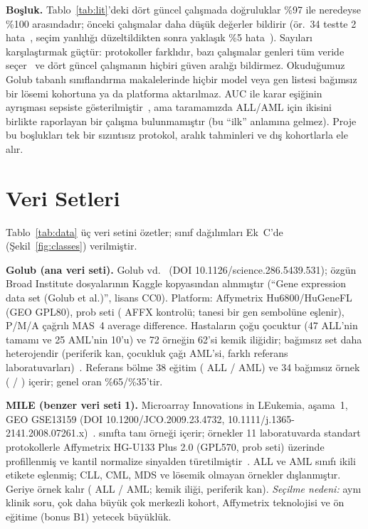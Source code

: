 \documentclass[conference]{IEEEtran}
\newcommand{\figref}[1]{Şekil~\ref{#1}}
\newcommand{\tabref}[1]{Tablo~\ref{#1}}
\begin{document}
\textbf{Boşluk.} \tabref{tab:lit}'deki dört güncel çalışmada doğruluklar \%97 ile neredeyse \%100
arasındadır; önceki çalışmalar daha düşük değerler bildirir (ör.\ 34 testte 2 hata~\cite{tibshirani2002},
seçim yanlılığı düzeltildikten sonra yaklaşık \%5 hata~\cite{ambroise2002}). Sayıları karşılaştırmak
güçtür: protokoller farklıdır, bazı çalışmalar genleri tüm veride seçer~\cite{guyon2002,xie2022,selvaraj2024}
ve dört güncel çalışmanın hiçbiri güven aralığı bildirmez. Okuduğumuz Golub tabanlı sınıflandırma
makalelerinde hiçbir model veya gen listesi bağımsız bir lösemi kohortuna ya da platforma aktarılmaz.
AUC ile karar eşiğinin ayrışması sepsiste gösterilmiştir~\cite{zheng2026}, ama taramamızda ALL/AML için
ikisini birlikte raporlayan bir çalışma bulunmamıştır (bu ``ilk'' anlamına gelmez). Proje bu boşlukları tek
bir sızıntısız protokol, aralık tahminleri ve dış kohortlarla ele alır.

\section{Veri Setleri}\label{sec:data}
\tabref{tab:data} üç veri setini özetler; sınıf dağılımları Ek~C'de (\figref{fig:classes}) verilmiştir.

\textbf{Golub (ana veri seti).} Golub vd.~\cite{golub1999} (DOI 10.1126/science.286.5439.531);
özgün Broad Institute dosyalarının Kaggle kopyasından alınmıştır (``Gene expression data set (Golub
et al.)'', lisans CC0). Platform: Affymetrix Hu6800/HuGeneFL (GEO GPL80), \GolubP{} prob seti
(\GolubAffx{} AFFX kontrolü; \GolubMapped{} tanesi bir gen sembolüne eşlenir), P/M/A çağrılı MAS~4
average difference. Hastaların çoğu çocuktur (47 ALL'nin tamamı ve 25 AML'nin 10'u) ve 72 örneğin
62'si kemik iliğidir; bağımsız set daha heterojendir (periferik kan, çocukluk çağı AML'si, farklı
referans laboratuvarları)~\cite{golub1999}. Referans bölme 38 eğitim (\GolubTrainALL{} ALL /
\GolubTrainAML{} AML) ve 34 bağımsız örnek (\GolubTestALL{} / \GolubTestAML{}) içerir; genel oran
\%65/\%35'tir.

\textbf{MILE (benzer veri seti 1).} Microarray Innovations in LEukemia, aşama~1, GEO GSE13159
(DOI 10.1200/JCO.2009.23.4732, 10.1111/j.1365-2141.2008.07261.x)~\cite{haferlach2010,kohlmann2008}.
\MileClassesTotal{} sınıfta \MileTotal{} tanı örneği içerir; örnekler 11 laboratuvarda standart
protokollerle Affymetrix HG-U133 Plus 2.0 (GPL570, \MileP{} prob seti) üzerinde profillenmiş ve
kantil normalize sinyalden türetilmiştir~\cite{haferlach2010}. \MileNSubtypes{} ALL ve AML sınıfı ikili
etikete eşlenmiş; CLL, CML, MDS ve lösemik olmayan örnekler dışlanmıştır. Geriye \MileN{} örnek
kalır (\MileALL{} ALL / \MileAML{} AML; \MileBM{} kemik iliği, \MilePB{} periferik kan).
\emph{Seçilme nedeni:} aynı klinik soru, çok daha büyük çok merkezli kohort, Affymetrix teknolojisi
ve ön eğitime (bonus B1) yetecek büyüklük.
\end{document}
